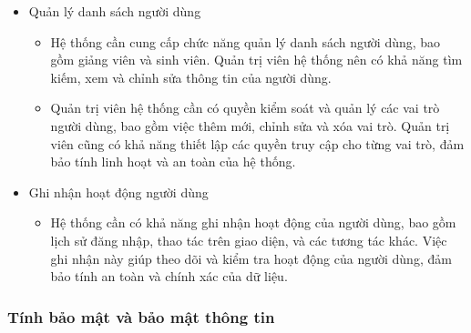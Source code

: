 \documentclass[../Thesis.tex]{subfiles}
\begin{document}
\begin{itemize}
                \item Quản lý danh sách người dùng
                    \begin{itemize}
                        \item Hệ thống cần cung cấp chức năng quản lý danh sách người dùng, bao gồm giảng viên và sinh viên. Quản trị viên hệ thống nên có khả năng tìm kiếm, xem và chỉnh sửa thông tin của người dùng.

                        \item Quản trị viên hệ thống cần có quyền kiểm soát và quản lý các vai trò người dùng, bao gồm việc thêm mới, chỉnh sửa và xóa vai trò. Quản trị viên cũng có khả năng thiết lập các quyền truy cập cho từng vai trò, đảm bảo tính linh hoạt và an toàn của hệ thống.
                    \end{itemize}

                \item Ghi nhận hoạt động người dùng
                    \begin{itemize}
                        \item Hệ thống cần có khả năng ghi nhận hoạt động của người dùng, bao gồm lịch sử đăng nhập, thao tác trên giao diện, và các tương tác khác. Việc ghi nhận này giúp theo dõi và kiểm tra hoạt động của người dùng, đảm bảo tính an toàn và chính xác của dữ liệu.
                    \end{itemize}
            \end{itemize}

        \subsubsection{Tính bảo mật và bảo mật thông tin}
\end{document}
